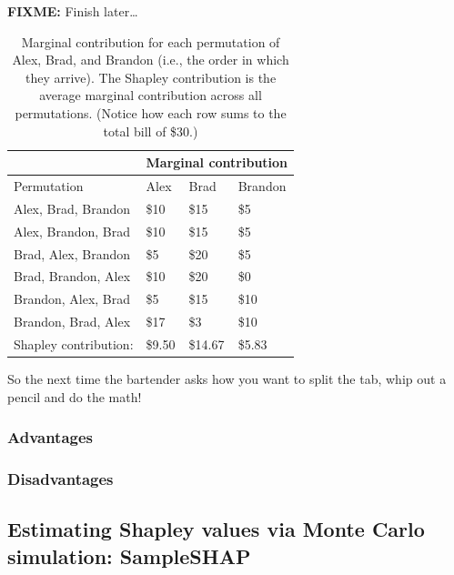 \textbf{FIXME:} Finish later\ldots{}

\begin{table}[]
\centering
\begin{tabular}{@{}llll@{}}
\toprule
                      & \multicolumn{3}{l}{Marginal contribution} \\ \midrule
Permutation           & Alex        & Brad         & Brandon      \\ \midrule
Alex, Brad, Brandon   & \$10        & \$15         & \$5          \\ 
Alex, Brandon, Brad   & \$10        & \$15         & \$5          \\
Brad, Alex, Brandon   & \$5         & \$20         & \$5          \\
Brad, Brandon, Alex   & \$10        & \$20         & \$0          \\
Brandon, Alex, Brad   & \$5         & \$15         & \$10         \\
Brandon, Brad, Alex   & \$17        & \$3          & \$10         \\ \midrule
Shapley contribution: & \$9.50      & \$14.67      & \$5.83       \\ \bottomrule
\end{tabular}
\caption{Marginal contribution for each permutation of Alex, Brad, and Brandon (i.e., the order in which they arrive). The Shapley contribution is the average marginal contribution across all permutations. (Notice how each row sums to the total bill of \$30.)}
\end{table}

So the next time the bartender asks how you want to split the tab, whip
out a pencil and do the math!

\hypertarget{advantages}{%
\subsubsection{Advantages}\label{advantages}}

\hypertarget{disadvantages}{%
\subsubsection{Disadvantages}\label{disadvantages}}

\hypertarget{estimating-shapley-values-via-monte-carlo-simulation-sampleshap}{%
\subsection{Estimating Shapley values via Monte Carlo simulation:
SampleSHAP}\label{estimating-shapley-values-via-monte-carlo-simulation-sampleshap}}

